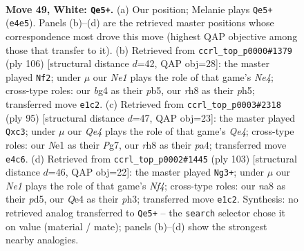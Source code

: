 \documentclass[11pt]{article}
\begin{document}
\clearpage

\begin{figure}[p]\centering
\begin{subfigure}{0.46\textwidth}\centering
\resizebox{\linewidth}{!}{%
\newchessgame
\chessboard[
  setfen={n6r/8/8/1p4k1/4Q1bp/P2P4/7K/4Nq2 w - - 12 49},
  showmover=false,
  pgfstyle=straightmove, color=movearrow, markmove={e4-e5}
]}
\caption{}
\end{subfigure}\hfill
\begin{subfigure}{0.46\textwidth}\centering
\resizebox{\linewidth}{!}{%
\newchessgame
\chessboard[
  setfen={8/1kp5/8/1p5p/4N2K/p1P2q2/P1Q5/8 w - - 4 54},
  showmover=false,
  pgfstyle=straightmove, color=movearrow, markmove={e4-f2}
]}
\caption{}
\end{subfigure}
\\[4pt]
\begin{subfigure}{0.46\textwidth}\centering
\resizebox{\linewidth}{!}{%
\newchessgame
\chessboard[
  setfen={7k/p4Qp1/7p/2p1q3/P6P/2P3NK/8/8 b - - 6 48},
  showmover=false,
  pgfstyle=straightmove, color=movearrow, markmove={e5-c3}
]}
\caption{}
\end{subfigure}\hfill
\begin{subfigure}{0.46\textwidth}\centering
\resizebox{\linewidth}{!}{%
\newchessgame
\chessboard[
  setfen={8/7k/6p1/2pP1n1p/8/7P/2Q2qP1/2R4K b - - 0 52},
  showmover=false,
  pgfstyle=straightmove, color=movearrow, markmove={f5-g3}
]}
\caption{}
\end{subfigure}
\caption{\textbf{Move 49, White: \texttt{Qe5+}.} (a) Our position; Melanie plays \texttt{Qe5+} (\texttt{e4e5}). Panels (b)--(d) are the retrieved master positions whose correspondence most drove this move (highest QAP objective among those that transfer to it). (b) Retrieved from \texttt{ccrl\_top\_p0000\#1379} (ply 106) [structural distance $d$=42, QAP obj=28]: the master played \texttt{Nf2}; under $\mu$ our \emph{Ne1} plays the role of that game's \emph{Ne4}; cross-type roles: our \emph{b}g4 as their \emph{p}b5, our \emph{r}h8 as their \emph{p}h5; transferred move \texttt{e1c2}. (c) Retrieved from \texttt{ccrl\_top\_p0003\#2318} (ply 95) [structural distance $d$=47, QAP obj=23]: the master played \texttt{Qxc3}; under $\mu$ our \emph{Qe4} plays the role of that game's \emph{Qe4}; cross-type roles: our \emph{N}e1 as their \emph{P}g7, our \emph{r}h8 as their \emph{p}a4; transferred move \texttt{e4c6}. (d) Retrieved from \texttt{ccrl\_top\_p0002\#1445} (ply 103) [structural distance $d$=46, QAP obj=22]: the master played \texttt{Ng3+}; under $\mu$ our \emph{Ne1} plays the role of that game's \emph{Nf4}; cross-type roles: our \emph{n}a8 as their \emph{p}d5, our \emph{Q}e4 as their \emph{p}h3; transferred move \texttt{e1c2}. Synthesis: no retrieved analog transferred to \texttt{Qe5+} -- the \texttt{search} selector chose it on value (material / mate); panels (b)--(d) show the strongest nearby analogies.}
\label{fig:thought-m96}
\end{figure}
\end{document}
